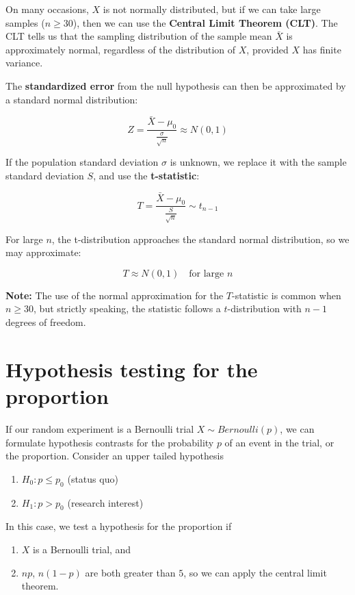 \documentclass[
]{book}
\providecommand{\tightlist}{%
  \setlength{\itemsep}{0pt}\setlength{\parskip}{0pt}}
\begin{document}
On many occasions, \(X\) is not normally distributed, but if we can take large samples (\(n \ge 30\)), then we can use the \textbf{Central Limit Theorem (CLT)}. The CLT tells us that the sampling distribution of the sample mean \(\bar{X}\) is approximately normal, regardless of the distribution of \(X\), provided \(X\) has finite variance.

The \textbf{standardized error} from the null hypothesis can then be approximated by a standard normal distribution:

\[
Z = \frac{\bar{X} - \mu_0}{\frac{\sigma}{\sqrt{n}}} \approx N(0, 1)
\]

If the population standard deviation \(\sigma\) is unknown, we replace it with the sample standard deviation \(S\), and use the \textbf{t-statistic}:

\[
T = \frac{\bar{X} - \mu_0}{\frac{S}{\sqrt{n}}} \sim t_{n-1}
\]

For large \(n\), the t-distribution approaches the standard normal distribution, so we may approximate:

\[
T \approx N(0, 1) \quad \text{for large } n
\]

\textbf{Note:} The use of the normal approximation for the \(T\)-statistic is common when \(n \ge 30\), but strictly speaking, the statistic follows a \(t\)-distribution with \(n-1\) degrees of freedom.

\hypertarget{hypothesis-testing-for-the-proportion}{%
\section{Hypothesis testing for the proportion}\label{hypothesis-testing-for-the-proportion}}

If our random experiment is a Bernoulli trial \(X \sim Bernoulli(p)\), we can formulate hypothesis contrasts for the probability \(p\) of an event in the trial, or the proportion. Consider an upper tailed hypothesis

\begin{enumerate}
\def\labelenumi{\alph{enumi}.}
\tightlist
\item
  \(H_0: p \leq p_0\) (status quo)
\item
  \(H_1: p> p_0\) (research interest)
\end{enumerate}

In this case, we test a hypothesis for the proportion if

\begin{enumerate}
\def\labelenumi{\arabic{enumi}.}
\tightlist
\item
  \(X\) is a Bernoulli trial, and
\item
  \(np\), \(n(1-p)\) are both greater than \(5\), so we can apply the central limit theorem.
\end{enumerate}
\end{document}
